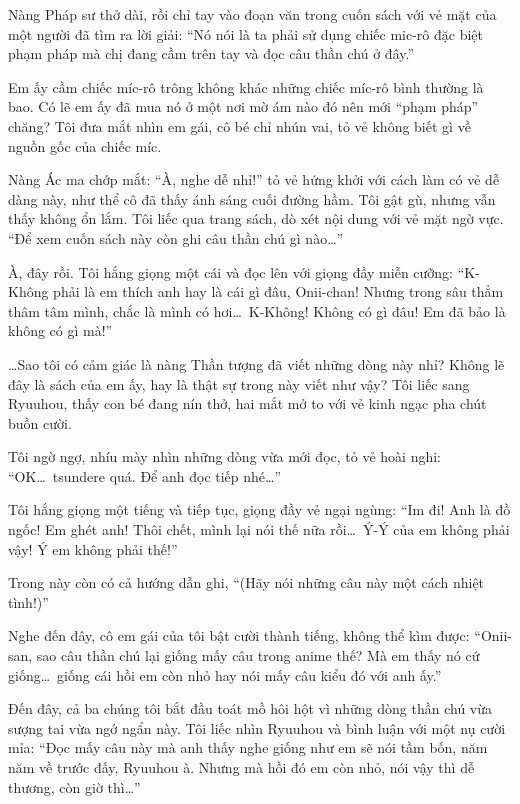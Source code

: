 \documentclass[../main.tex]{subfiles}
\begin{document}
Nàng Pháp sư thở dài, rồi chỉ tay vào đoạn văn trong cuốn sách với vẻ mặt của một người đã tìm ra lời giải: ``Nó nói là ta phải sử dụng chiếc mic-rô đặc biệt phạm pháp mà chị đang cầm trên tay và đọc câu thần chú ở đây.''

Em ấy cầm chiếc míc-rô trông không khác những chiếc míc-rô bình thường là bao. Có lẽ em ấy đã mua nó ở một nơi mờ ám nào đó nên mới ``phạm pháp'' chăng? Tôi đưa mắt nhìn em gái, cô bé chỉ nhún vai, tỏ vẻ không biết gì về nguồn gốc của chiếc míc.


Nàng Ác ma chớp mắt: ``À, nghe dễ nhỉ!'' tỏ vẻ hứng khởi với cách làm có vẻ dễ dàng này, như thể cô đã thấy ánh sáng cuối đường hầm. Tôi gật gù, nhưng vẫn thấy không ổn lắm. Tôi liếc qua trang sách, dò xét nội dung với vẻ mặt ngờ vực. ``Để xem cuốn sách này còn ghi câu thần chú gì nào\dots''

À, đây rồi. Tôi hắng giọng một cái và đọc lên với giọng đầy miễn cưỡng: ``K-Không phải là em thích anh hay là cái gì đâu, Onii-chan! Nhưng trong sâu thẳm thâm tâm mình, chắc là mình có hơi\dots\ K-Không! Không có gì đâu! Em đã bảo là không có gì mà!''

\dots Sao tôi có cảm giác là nàng Thần tượng đã viết những dòng này nhỉ? Không lẽ đây là sách của em ấy, hay là thật sự trong này viết như vậy? Tôi liếc sang Ryuuhou, thấy con bé đang nín thở, hai mắt mở to với vẻ kinh ngạc pha chút buồn cười.

Tôi ngờ ngợ, nhíu mày nhìn những dòng vừa mới đọc, tỏ vẻ hoài nghi: ``OK\dots\ tsundere quá. Để anh đọc tiếp nhé\dots''

Tôi hắng giọng một tiếng và tiếp tục, giọng đầy vẻ ngại ngùng: ``Im đi! Anh là đồ ngốc! Em ghét anh! Thôi chết, mình lại nói thế nữa rồi\dots\ Ý-Ý của em không phải vậy! Ý em không phải thế!''

Trong này còn có cả hướng dẫn ghi, ``(Hãy nói những câu này một cách nhiệt tình!)''

Nghe đến đây, cô em gái của tôi bật cười thành tiếng, không thể kìm được: ``Onii-san, sao câu thần chú lại giống mấy câu trong anime thế? Mà em thấy nó cứ giống\dots\ giống cái hồi em còn nhỏ hay nói mấy câu kiểu đó với anh ấy.''

Đến đây, cả ba chúng tôi bắt đầu toát mồ hôi hột vì những dòng thần chú vừa sượng tai vừa ngớ ngẩn này. Tôi liếc nhìn Ryuuhou và bình luận với một nụ cười mỉa: ``Đọc mấy câu này mà anh thấy nghe giống như em sẽ nói tầm bốn, năm năm về trước đấy, Ryuuhou à. Nhưng mà hồi đó em còn nhỏ, nói vậy thì dễ thương, còn giờ thì\dots''
\end{document}

